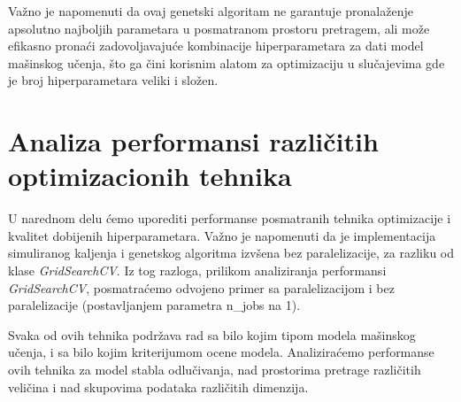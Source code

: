\documentclass{article}
\begin{document}
Važno je napomenuti da ovaj genetski algoritam ne garantuje pronalaženje apsolutno najboljih parametara u posmatranom prostoru pretragem, ali može efikasno pronaći zadovoljavajuće kombinacije hiperparametara za dati model mašinskog učenja, što ga čini korisnim alatom za optimizaciju u slučajevima gde je broj hiperparametara veliki i složen.
\noindent 
\newpage 
\section{Analiza performansi različitih optimizacionih tehnika}
\vspace{0.5 cm}
U narednom delu ćemo uporediti performanse posmatranih tehnika optimizacije i kvalitet dobijenih hiperparametara. Važno je napomenuti da je implementacija simuliranog kaljenja i genetskog algoritma izvšena bez paralelizacije, za razliku od klase \textit{GridSearchCV}. Iz tog razloga, prilikom analiziranja performansi \textit{GridSearchCV}, posmatraćemo odvojeno primer sa paralelizacijom i bez paralelizacije (postavljanjem parametra n\_jobs na 1).\newline

\noindent Svaka od ovih tehnika podržava rad sa bilo kojim tipom modela mašinskog učenja, i sa bilo kojim kriterijumom ocene modela. Analiziraćemo performanse ovih tehnika za model stabla odlučivanja, nad prostorima pretrage različitih veličina i nad skupovima podataka različitih dimenzija. 
\end{document}
